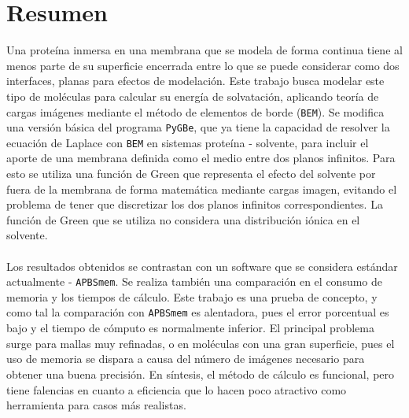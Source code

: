 \section*{Resumen}
\noindent
Una proteína inmersa en una membrana que se modela de forma continua tiene al menos parte de su superficie encerrada entre lo que se puede considerar como dos interfaces, planas para efectos de modelación. Este trabajo busca modelar este tipo de moléculas para calcular su energía de solvatación, aplicando teoría de cargas imágenes mediante el método de elementos de borde (\texttt{BEM}). Se modifica una versión básica del programa \texttt{PyGBe}, que ya tiene la capacidad de resolver la ecuación de Laplace con \texttt{BEM} en sistemas proteína - solvente, para incluir el aporte de una membrana definida como el medio entre dos planos infinitos. Para esto se utiliza una función de Green que representa el efecto del solvente por fuera de la membrana de forma matemática mediante cargas imagen, evitando el problema de tener que discretizar los dos planos infinitos correspondientes. La función de Green que se utiliza no considera una distribución iónica en el solvente.\\\\
Los resultados obtenidos se contrastan con un software que se considera estándar actualmente - \texttt{APBSmem}. Se realiza también una comparación en el consumo de memoria y los tiempos de cálculo. Este trabajo es una prueba de concepto, y como tal la comparación con \texttt{APBSmem} es alentadora, pues el error porcentual es bajo y el tiempo de cómputo es normalmente inferior. El principal problema surge para mallas muy refinadas, o en moléculas con una gran superficie, pues el uso de memoria se dispara a causa del número de imágenes necesario para obtener una buena precisión. En síntesis, el método de cálculo es funcional, pero tiene falencias en cuanto a eficiencia que lo hacen poco atractivo como herramienta para casos más realistas.